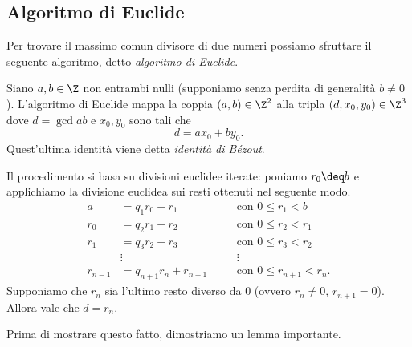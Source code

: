 \subsection{Algoritmo di Euclide}

Per trovare il massimo comun divisore di due numeri possiamo sfruttare il seguente algoritmo, detto \emph{algoritmo di Euclide}.

Siano $a, b \in \Z$ non entrambi nulli (supponiamo senza perdita di generalità $b \neq 0$). L'algoritmo di Euclide mappa la coppia $(a, b) \in \Z^2$ alla tripla $(d, x_0, y_0) \in \Z^3$ dove $d = \gcd{a}{b}$ e $x_0, y_0$ sono tali che \begin{equation}
    d = ax_0 + by_0. \label{eq:bézout}
\end{equation} Quest'ultima identità viene detta \emph{identità di Bézout}.

Il procedimento si basa su divisioni euclidee iterate: poniamo $r_0 \deq b$ e applichiamo la divisione euclidea sui resti ottenuti nel seguente modo.
\begin{align*}
    a &= q_1r_0 + r_1 \quad &&\text{con } 0 \leq r_1 < b \\
    r_0 &= q_2r_1 + r_2 \quad &&\text{con } 0 \leq r_2 < r_1 \\
    r_1 &= q_3r_2 + r_3 \quad &&\text{con } 0 \leq r_3 < r_2 \\
    &\vdots &&\vdots\\
    r_{n-1} &= q_{n+1}r_n + r_{n+1} \quad &&\text{con } 0 \leq r_{n+1} < r_n.
\end{align*}
Supponiamo che $r_n$ sia l'ultimo resto diverso da $0$ (ovvero $r_n \neq 0$, $r_{n+1} = 0$). Allora vale che $d = r_n$.

Prima di mostrare questo fatto, dimostriamo un lemma importante.

